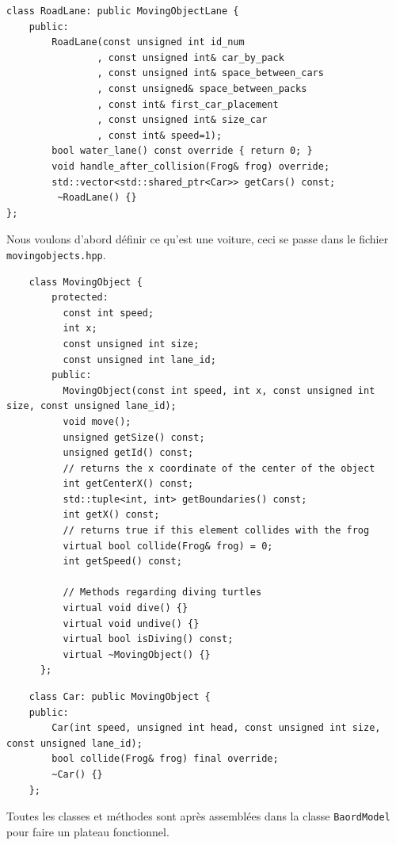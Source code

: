 \documentclass[a4paper, 12pt]{article}
\begin{document}
\begin{lstlisting}
class RoadLane: public MovingObjectLane {
    public:
        RoadLane(const unsigned int id_num
                , const unsigned int& car_by_pack
                , const unsigned int& space_between_cars
                , const unsigned& space_between_packs
                , const int& first_car_placement
                , const unsigned int& size_car
                , const int& speed=1);
        bool water_lane() const override { return 0; }
        void handle_after_collision(Frog& frog) override;
        std::vector<std::shared_ptr<Car>> getCars() const;
         ~RoadLane() {}
};
\end{lstlisting}

Nous voulons d'abord définir ce qu'est une voiture, ceci se passe dans le fichier \texttt{movingobjects.hpp}. \\

\begin{lstlisting}
    class MovingObject {
        protected:
          const int speed;
          int x;
          const unsigned int size;
          const unsigned int lane_id;
        public:
          MovingObject(const int speed, int x, const unsigned int size, const unsigned lane_id);
          void move();
          unsigned getSize() const;
          unsigned getId() const;
          // returns the x coordinate of the center of the object
          int getCenterX() const;
          std::tuple<int, int> getBoundaries() const;
          int getX() const;
          // returns true if this element collides with the frog
          virtual bool collide(Frog& frog) = 0;
          int getSpeed() const;
      
          // Methods regarding diving turtles
          virtual void dive() {}
          virtual void undive() {}
          virtual bool isDiving() const;
          virtual ~MovingObject() {}
      };
\end{lstlisting}

\begin{lstlisting}
    class Car: public MovingObject {
    public:
        Car(int speed, unsigned int head, const unsigned int size, const unsigned lane_id);
        bool collide(Frog& frog) final override;
        ~Car() {}
    };
\end{lstlisting}

Toutes les classes et méthodes sont après assemblées dans la classe \texttt{BaordModel} pour faire un plateau fonctionnel. \\
\end{document}
